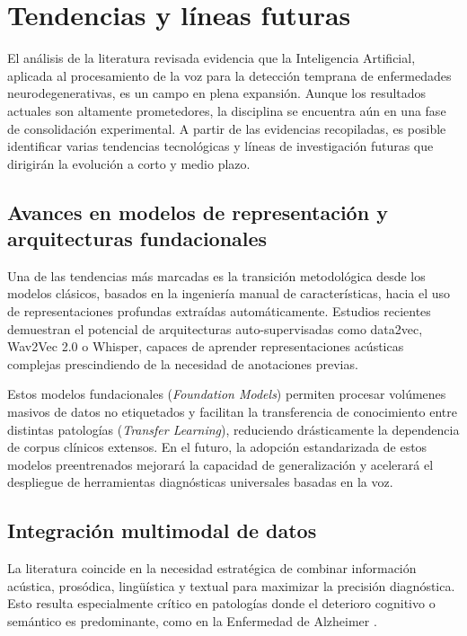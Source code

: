 \section{Tendencias y líneas futuras}\label{sec:tendencias}

El análisis de la literatura revisada evidencia que la Inteligencia Artificial, aplicada al procesamiento de la voz para la detección temprana de enfermedades neurodegenerativas, es un campo en plena expansión. Aunque los resultados actuales son altamente prometedores, la disciplina se encuentra aún en una fase de consolidación experimental. A partir de las evidencias recopiladas, es posible identificar varias tendencias tecnológicas y líneas de investigación futuras que dirigirán la evolución a corto y medio plazo.

\subsection{Avances en modelos de representación y arquitecturas fundacionales}
Una de las tendencias más marcadas es la transición metodológica desde los modelos clásicos, basados en la ingeniería manual de características, hacia el uso de representaciones profundas extraídas automáticamente. Estudios recientes \cite{agbavor2022, dao2025} demuestran el potencial de arquitecturas auto-supervisadas como data2vec, Wav2Vec 2.0 o Whisper, capaces de aprender representaciones acústicas complejas prescindiendo de la necesidad de anotaciones previas. 

Estos modelos fundacionales (\textit{Foundation Models}) permiten procesar volúmenes masivos de datos no etiquetados y facilitan la transferencia de conocimiento entre distintas patologías (\textit{Transfer Learning}), reduciendo drásticamente la dependencia de corpus clínicos extensos. En el futuro, la adopción estandarizada de estos modelos preentrenados mejorará la capacidad de generalización y acelerará el despliegue de herramientas diagnósticas universales basadas en la voz.

\subsection{Integración multimodal de datos}
La literatura coincide en la necesidad estratégica de combinar información acústica, prosódica, lingüística y textual para maximizar la precisión diagnóstica. Esto resulta especialmente crítico en patologías donde el deterioro cognitivo o semántico es predominante, como en la Enfermedad de Alzheimer \cite{garcia-gutierrezUnveilingSoundCognitive2024, he2023}. 


